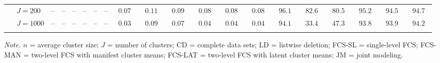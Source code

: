 \begin{sidewaystable}
\begin{threeparttable}
\begin{tabular}{llcccccccccccccccccc}
 & \nopagebreak $\;J=200$  & \phantom{00}--\phantom{00} & \phantom{00}--\phantom{00} & \phantom{00}--\phantom{00} & \phantom{00}--\phantom{00} & \phantom{00}--\phantom{00} & \phantom{00}--\phantom{00} & $\phantom{0}0.07\phantom{0}$ & $\phantom{0}0.11\phantom{0}$ & $\phantom{0}0.09\phantom{0}$ & $\phantom{0}0.08\phantom{0}$ & $\phantom{0}0.08\phantom{0}$ & $\phantom{0}0.08\phantom{0}$ & $\phantom{0}96.1\phantom{0}$ & $\phantom{0}82.6\phantom{0}$ & $\phantom{0}80.5\phantom{0}$ & $\phantom{0}95.2\phantom{0}$ & $\phantom{0}94.5\phantom{0}$ & $\phantom{0}94.7\phantom{0}$ \\
 & \nopagebreak $\;J=1000$  & \phantom{00}--\phantom{00} & \phantom{00}--\phantom{00} & \phantom{00}--\phantom{00} & \phantom{00}--\phantom{00} & \phantom{00}--\phantom{00} & \phantom{00}--\phantom{00} & $\phantom{0}0.03\phantom{0}$ & $\phantom{0}0.09\phantom{0}$ & $\phantom{0}0.07\phantom{0}$ & $\phantom{0}0.04\phantom{0}$ & $\phantom{0}0.04\phantom{0}$ & $\phantom{0}0.04\phantom{0}$ & $\phantom{0}94.1\phantom{0}$ & $\phantom{0}33.4\phantom{0}$ & $\phantom{0}47.3\phantom{0}$ & $\phantom{0}93.8\phantom{0}$ & $\phantom{0}93.9\phantom{0}$ & $\phantom{0}94.2\phantom{0}$ \\
[0.5ex]\hline\\[-1.6ex] 
\end{tabular}
\begin{tablenotes}{\footnotesize \textit{Note.} $n$ = average cluster size; $J$ = number of clusters; CD = complete data sets; LD = listwise deletion; FCS-SL = single-level FCS; FCS-MAN = two-level FCS with manifest cluster means; FCS-LAT = two-level FCS with latent cluster means; JM = joint modeling.}\end{tablenotes}
\end{threeparttable}
\end{sidewaystable}
